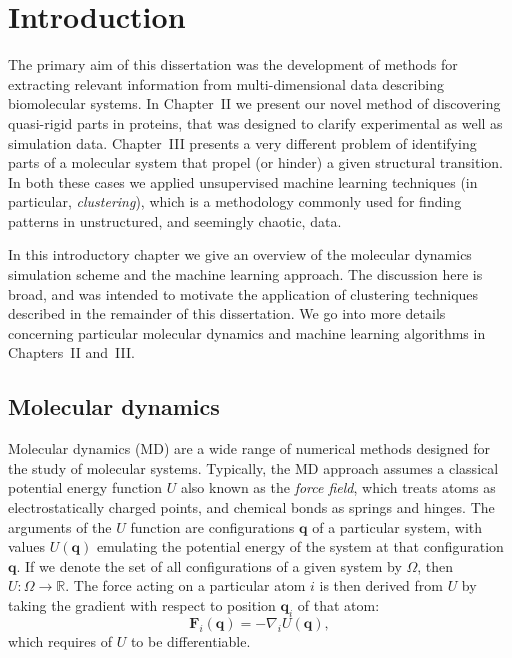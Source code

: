 \documentclass[a4paper,11pt,twoside]{book}%
\begin{document}
 



\tableofcontents

\chapter{Introduction}

The primary aim of this dissertation was the development of methods for extracting relevant information from multi-dimensional data describing biomolecular systems.
In Chapter~II we present our novel method of discovering quasi-rigid parts in proteins, that was designed to clarify experimental as well as simulation data.
Chapter~III presents a very different problem of identifying parts of a molecular system that propel (or hinder) a given structural transition.
In both these cases we applied unsupervised machine learning techniques (in particular, \emph{clustering}), which is a methodology commonly used for finding patterns in unstructured, and seemingly chaotic, data.

In this introductory chapter we give an overview of the molecular dynamics simulation scheme and the machine learning approach.
The discussion here is broad, and was intended to motivate the application of clustering techniques described in the remainder of this dissertation. %
We go into more details concerning particular molecular dynamics and machine learning algorithms in Chapters~II and~III. %


\section{Molecular dynamics}

Molecular dynamics (MD) are a wide range of numerical methods designed for the study of molecular systems.
Typically, the MD approach assumes a classical potential energy function $U$ also known as the \emph{force field}, which treats atoms as electrostatically charged points, and chemical bonds as springs and hinges.
The arguments of the $U$ function are configurations $\mathbf{q}$ of a particular system, with values $U(\mathbf{q})$ emulating the potential energy of the system at that configuration $\mathbf{q}$.
If we denote the set of all configurations of a given system by $\Omega$, then $U\colon\Omega\to\mathbb{R}$. %
The force acting on a particular atom $i$ is then derived from $U$ by taking the gradient with respect to position $\mathbf{q}_i$ of that atom:
$$
\mathbf{F}_i(\mathbf{q}) = -\nabla_i U(\mathbf{q}),
$$
which requires of $U$ to be differentiable. 
\end{document}
